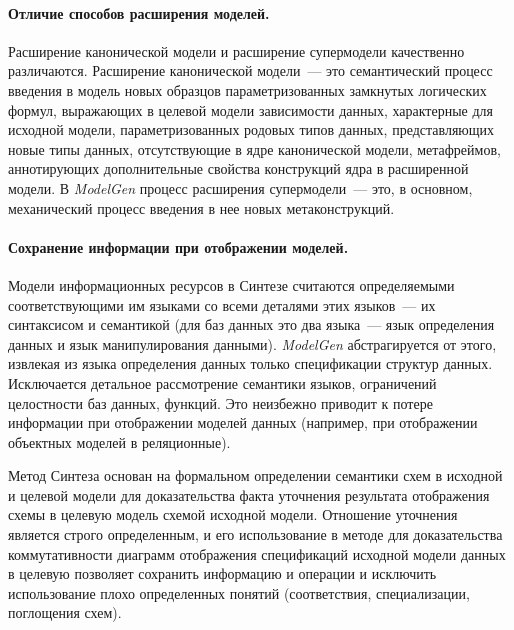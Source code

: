 \begin{multicols}{2}
\paragraph*{Отличие способов расширения моделей.}Расширение канонической
модели и расширение супермодели качественно различаются. Расширение
канонической модели~--- это семантический процесс введения в модель новых
образцов параметризованных замкнутых логических формул, выражающих в
целевой модели зависимости данных, характерные для исходной модели,
параметризованных родовых типов данных, представляющих новые типы
данных, отсутствующие в ядре канонической модели, метафреймов,
аннотирующих дополнительные свойства конструкций ядра в расширенной
модели. В {\em ModelGen} процесс расширения супермодели~--- это, в
основном, механический процесс введения в нее новых метаконструкций.

\paragraph*{Сохранение информации при отображении мо\-делей.}Модели
информационных ресурсов в Синте\-зе %
счита\-ют\-ся определяемыми
соответствующими им языками со всеми деталями этих язы\-ков~--- их
синтак\-си\-сом и семантикой (для баз данных это два язы\-ка~--- язык определения
данных и язык манипулирования данными). {\em ModelGen} абстрагируется
от этого, извлекая из языка определения данных только спецификации
структур данных. Исключается детальное рассмотрение семантики языков,
ограничений целостности баз данных, функций. Это неизбежно приводит к
потере информации при отоб\-ра\-же\-нии моделей данных (например, при
отоб\-ра\-же\-нии объектных моделей в реляционные).

Метод Синтеза основан на формальном определении семантики схем в
исходной и целевой модели для доказательства факта уточнения
результата отображения схемы в целевую модель схемой исходной модели.
Отношение уточнения является строго определенным, и его использование в
методе для доказательства коммутативности диаграмм отображения
спецификаций исходной модели данных в целевую позволяет сохранить
информацию и операции и исключить использование плохо определенных
понятий (соответствия, специализации, поглощения схем).


\end{multicols}
